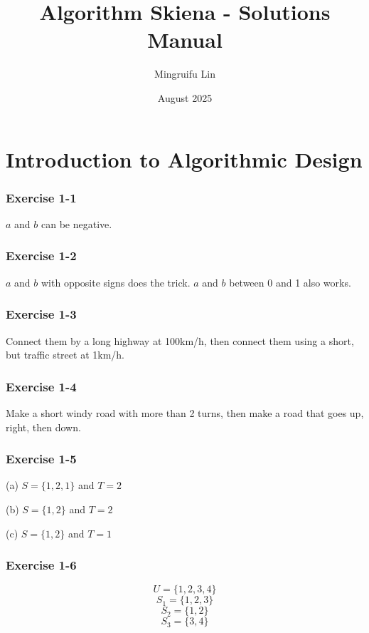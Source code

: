\documentclass{book}
\title{Algorithm Skiena - Solutions Manual}
\author{Mingruifu Lin}
\date{August 2025}
\begin{document}
\maketitle

\tableofcontents

\chapter{Introduction to Algorithmic Design}

\subsection*{Exercise 1-1}
$a$ and $b$ can be negative.

\subsection*{Exercise 1-2}
$a$ and $b$ with opposite signs does the trick. $a$ and $b$ between 0 and 1 also works.

\subsection*{Exercise 1-3}
Connect them by a long highway at 100km/h, then connect them using a short, but traffic street at 1km/h.

\subsection*{Exercise 1-4}
Make a short windy road with more than 2 turns, then make a road that goes up, right, then down.

\subsection*{Exercise 1-5}
(a)
$S = \{ 1, 2, 1 \}$ and $T = 2$

\noindent
(b)
$S = \{ 1, 2 \}$ and $T = 2$

\noindent
(c)
$S = \{ 1, 2 \}$ and $T = 1$

\subsection*{Exercise 1-6}
$$U = \{ 1, 2, 3, 4 \}$$
$$S_1 = \{ 1, 2, 3 \}$$
$$S_2 = \{ 1, 2 \}$$
$$S_3 = \{ 3, 4 \}$$
\end{document}
